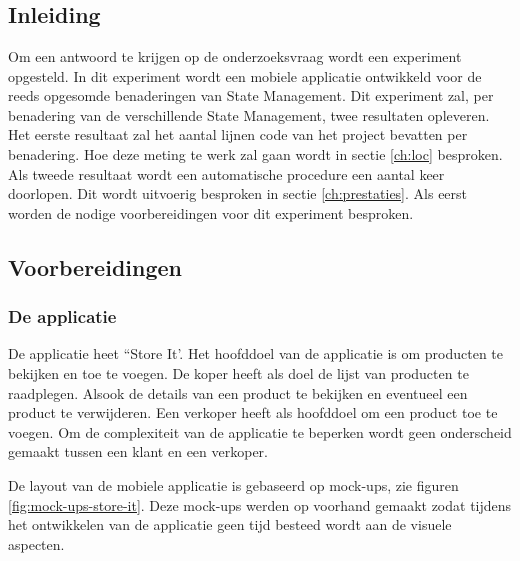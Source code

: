 
\chapter{}
\label{ch:methodologie}

\section{Inleiding}
Om een antwoord te krijgen op de onderzoeksvraag wordt een experiment opgesteld. In dit experiment wordt een mobiele applicatie ontwikkeld voor de reeds opgesomde benaderingen van State Management. Dit experiment zal, per benadering van de verschillende State Management, twee resultaten opleveren. Het eerste resultaat zal het aantal lijnen code van het project bevatten per benadering. Hoe deze meting te werk zal gaan wordt in sectie \ref{ch:loc} besproken. Als tweede resultaat wordt een automatische procedure een aantal keer doorlopen. Dit wordt uitvoerig besproken in sectie \ref{ch:prestaties}. \newline
Als eerst worden de nodige voorbereidingen voor dit experiment besproken.

\section{Voorbereidingen}
\subsection{De applicatie}
De applicatie heet ``Store It'. Het hoofddoel van de applicatie is om producten te bekijken en toe te voegen. De koper heeft als doel de lijst van producten te raadplegen. Alsook de details van een product te bekijken en eventueel een product te verwijderen. Een verkoper heeft als hoofddoel om een product toe te voegen. Om de complexiteit van de applicatie te beperken wordt geen onderscheid gemaakt tussen een klant en een verkoper.\newline

De layout van de mobiele applicatie is gebaseerd op mock-ups, zie figuren \ref{fig:mock-ups-store-it}. Deze mock-ups werden op voorhand gemaakt zodat tijdens het ontwikkelen van de applicatie geen tijd besteed wordt aan de visuele aspecten.

